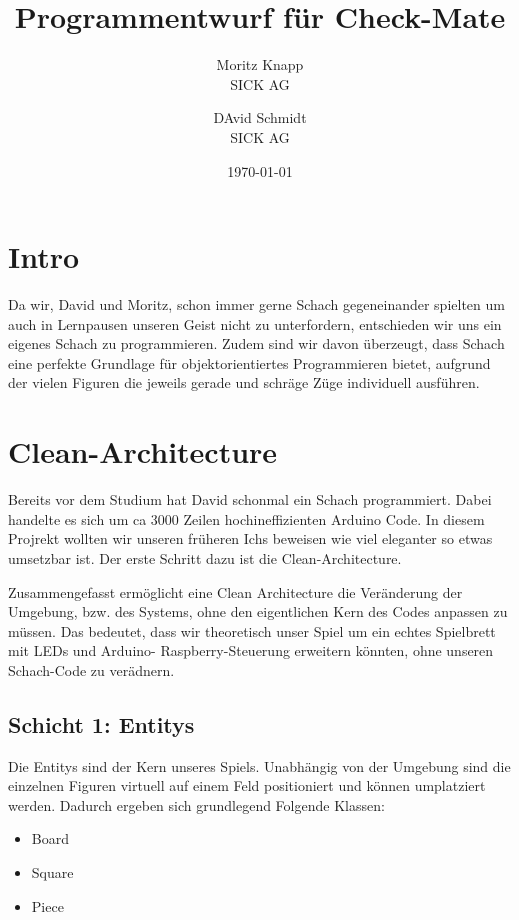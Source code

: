 \documentclass{article}
\title{Programmentwurf für Check-Mate}
\author{Moritz Knapp  \\
	SICK AG  \\
	\and 
	DAvid Schmidt \\
	SICK AG \\
	}
\date{\today}
\begin{document}
\maketitle

\tableofcontents
\newpage

\section{Intro}

Da wir, David und Moritz, schon immer gerne Schach gegeneinander spielten um auch in Lernpausen unseren Geist nicht zu unterfordern, entschieden wir uns ein eigenes Schach zu programmieren. 
Zudem sind wir davon überzeugt, dass Schach eine perfekte Grundlage für objektorientiertes Programmieren bietet, aufgrund der vielen Figuren die jeweils gerade und schräge Züge individuell ausführen.

\section{Clean-Architecture} \label{sec:cleanArc}
Bereits vor dem Studium hat David schonmal ein Schach programmiert. Dabei handelte es sich um ca 3000 Zeilen hochineffizienten Arduino Code. In diesem Projrekt wollten wir unseren früheren Ichs beweisen wie viel eleganter so etwas umsetzbar ist. Der erste Schritt dazu ist die Clean-Architecture.

Zusammengefasst ermöglicht eine Clean Architecture die Veränderung der Umgebung, bzw. des Systems, ohne den eigentlichen Kern des Codes anpassen zu müssen.
Das bedeutet, dass wir theoretisch unser Spiel um ein echtes Spielbrett mit LEDs und Arduino- Raspberry-Steuerung erweitern könnten, ohne unseren Schach-Code zu verädnern.

\subsection{Schicht 1: Entitys}
Die Entitys sind der Kern unseres Spiels. Unabhängig von der Umgebung sind die einzelnen Figuren virtuell auf einem Feld positioniert und können umplatziert werden.
Dadurch ergeben sich grundlegend Folgende Klassen: 

\begin{center}
	\begin{itemize}
		\item Board
		\item Square
		\item Piece
	\end{itemize}
\end{center}
\end{document}
